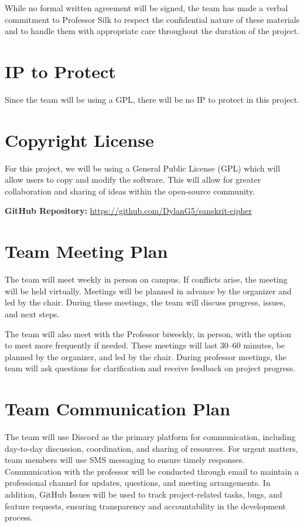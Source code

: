 \documentclass{article}
\begin{document}
While no formal written agreement will be signed, the team has made a verbal commitment to Professor Silk to respect the confidential nature of these materials and to handle them with appropriate care throughout the duration of the project.
\section{IP to Protect}


Since the team will be using a GPL, there will be no IP to protect in this project.
\section{Copyright License}

For this project, we will be using a General Public License (GPL) which will allow users to copy and modify the software. This will allow for greater collaboration and sharing of ideas within the open-source community.

\textbf{GitHub Repository:} \url{https://github.com/DylanG5/sanskrit-cipher}

\section{Team Meeting Plan}

The team will meet weekly in person on campus. If conflicts arise, the meeting will be held virtually. Meetings will be planned in advance by the organizer and led by the chair. During these meetings, the team will discuss progress, issues, and next steps.

The team will also meet with the Professor biweekly, in person, with the option to meet more frequently if needed. These meetings will last 30–60 minutes, be planned by the organizer, and led by the chair. During professor meetings, the team will ask questions for clarification and receive feedback on project progress.

\section{Team Communication Plan}

The team will use Discord as the primary platform for communication, including day-to-day
discussion, coordination, and sharing of resources. For urgent matters, team members will
use SMS messaging to ensure timely responses. Communication with the professor will
be conducted through email to maintain a professional channel for updates, questions, and
meeting arrangements. In addition, GitHub Issues will be used to track project-related tasks,
bugs, and feature requests, ensuring transparency and accountability in the development process.
\end{document}
